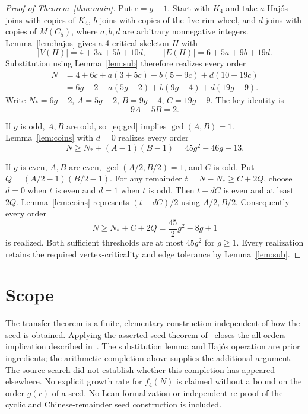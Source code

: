 \documentclass[11pt]{article}
\begin{document}
\begin{proof}[Proof of Theorem~\ref{thm:main}]
Put $c=g-1$. Start with $K_4$ and take $a$ Haj\'os joins with copies of
$K_4$, $b$ joins with copies of the five-rim wheel, and $d$ joins with
copies of $M(C_5)$, where $a,b,d$ are arbitrary nonnegative integers.
Lemma~\ref{lem:hajos} gives a 4-critical skeleton $H$ with
\[
|V(H)|=4+3a+5b+10d,\qquad |E(H)|=6+5a+9b+19d.
\]
Substitution using Lemma~\ref{lem:sub} therefore realizes every order
\begin{align*}
N&=4+6c+a(3+5c)+b(5+9c)+d(10+19c)\\
 &=6g-2+a(5g-2)+b(9g-4)+d(19g-9).
\end{align*}
Write $N_*=6g-2$, $A=5g-2$, $B=9g-4$, $C=19g-9$.
The key identity is
\begin{equation}\label{eq:gcd}
9A-5B=2.
\end{equation}

If $g$ is odd, $A,B$ are odd, so~\eqref{eq:gcd} implies
$\gcd(A,B)=1$. Lemma~\ref{lem:coins} with $d=0$ realizes every order
\[
N\geq N_*+(A-1)(B-1)=45g^2-46g+13.
\]

If $g$ is even, $A,B$ are even, $\gcd(A/2,B/2)=1$, and $C$ is odd.
Put $Q=(A/2-1)(B/2-1)$. For any remainder $t=N-N_*\geq C+2Q$,
choose $d=0$ when $t$ is even and $d=1$ when $t$ is odd.
Then $t-dC$ is even and at least $2Q$.
Lemma~\ref{lem:coins} represents $(t-dC)/2$ using $A/2,B/2$.
Consequently every order
\[
N\geq N_*+C+2Q=\frac{45}{2}g^2-8g+1
\]
is realized. Both sufficient thresholds are at most $45g^2$ for
$g\geq1$. Every realization retains the required vertex-criticality
and edge tolerance by Lemma~\ref{lem:sub}.
\end{proof}

\section{Scope}

The transfer theorem is a finite, elementary construction independent of
how the seed is obtained. Applying the asserted seed theorem of~\cite{KK}
closes the all-orders implication described in~\cite[Problem 1.1]{SS}.
The substitution lemma and Haj\'os operation are prior ingredients;
the arithmetic completion above supplies the additional argument.
The source search did not establish whether this completion has appeared
elsewhere. No explicit growth rate for $f_4(N)$ is claimed without a bound
on the order $g(r)$ of a seed. No Lean formalization or independent
re-proof of the cyclic and Chinese-remainder seed construction is included.
\end{document}
